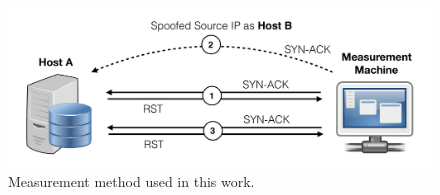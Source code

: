 \begin{figure}[t]
\centering
\includegraphics[width=0.8\columnwidth]{data_usage/images/croped_method_new.pdf}
\caption{Measurement method used in this work.}
\label{fig:new_method}
\end{figure}